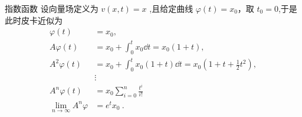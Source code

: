 \begin{example}{指数函数}
设向量场定义为 $v(x,t)=x$ ,且给定曲线 $\varphi(t)=x_0$，取 $t_0=0$,于是此时皮卡近似为
\begin{equation}
\begin{aligned}
\varphi(t)&=x_0,\\
A\varphi(t)&=x_0+\int_{0}^{t}x_0\dd t=x_0(1+t),\\
A^2\varphi(t)&=x_0+\int_{0}^{t}x_0(1+t)\dd t=x_0(1+t+\frac{1}{2}t^2),\\
&\vdots\\
A^n\varphi(t)&=x_0\sum_{i=0}^n\frac{t^i}{i!}\\
\lim_{n\rightarrow\infty}A^n\varphi&=e^tx_0
~.
\end{aligned}
\end{equation}
\end{example}